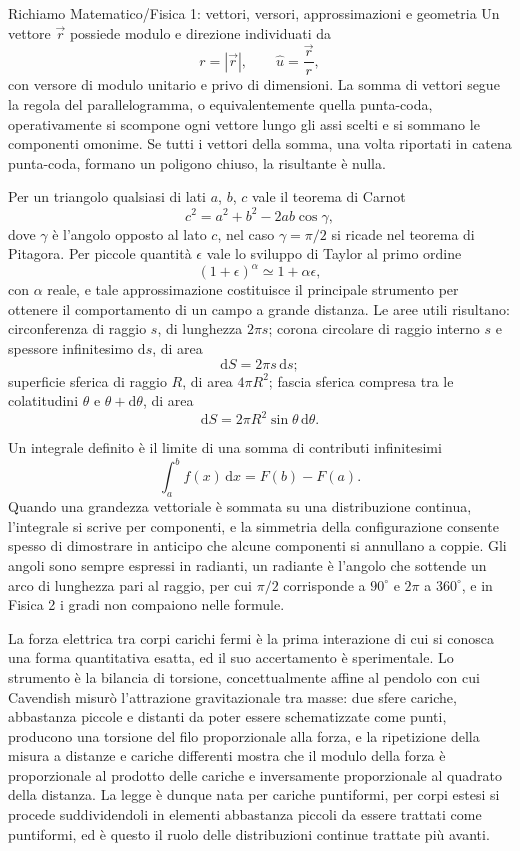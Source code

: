 \documentclass[11pt,a4paper]{article}
\newcommand{\dd}{\mathrm{d}}
\newcommand{\uv}{\hat{u}}
\newcommand{\titoletto}[1]{\par\Needspace{4\baselineskip}\medskip\noindent{\large\scshape #1}\par\nopagebreak\smallskip\noindent}
\begin{document}
\begin{richiamo}{Richiamo Matematico/Fisica 1: vettori, versori, approssimazioni e geometria}
Un vettore $\vec r$ possiede modulo e direzione individuati da
\[
r=|\vec r|, \qquad \uv=\frac{\vec r}{r},
\]
con versore di modulo unitario e privo di dimensioni. La somma di vettori segue la regola del parallelogramma, o equivalentemente quella punta-coda, operativamente si scompone ogni vettore lungo gli assi scelti e si sommano le componenti omonime. Se tutti i vettori della somma, una volta riportati in catena punta-coda, formano un poligono chiuso, la risultante è nulla.

Per un triangolo qualsiasi di lati $a$, $b$, $c$ vale il teorema di Carnot
\[
c^2=a^2+b^2-2ab\cos\gamma,
\]
dove $\gamma$ è l'angolo opposto al lato $c$, nel caso $\gamma=\pi/2$ si ricade nel teorema di Pitagora. Per piccole quantità $\epsilon$ vale lo sviluppo di Taylor al primo ordine
\[
(1+\epsilon)^{\alpha}\simeq 1+\alpha\epsilon,
\]
con $\alpha$ reale, e tale approssimazione costituisce il principale strumento per ottenere il comportamento di un campo a grande distanza. Le aree utili risultano: circonferenza di raggio $s$, di lunghezza $2\pi s$; corona circolare di raggio interno $s$ e spessore infinitesimo $\dd s$, di area
\[
\dd S=2\pi s\,\dd s;
\]
superficie sferica di raggio $R$, di area $4\pi R^2$; fascia sferica compresa tra le colatitudini $\theta$ e $\theta+\dd\theta$, di area
\[
\dd S=2\pi R^2\sin\theta\,\dd\theta.
\]

Un integrale definito è il limite di una somma di contributi infinitesimi
\[
\int_a^b f(x)\,\dd x = F(b)-F(a).
\]
Quando una grandezza vettoriale è sommata su una distribuzione continua, l'integrale si scrive per componenti, e la simmetria della configurazione consente spesso di dimostrare in anticipo che alcune componenti si annullano a coppie. Gli angoli sono sempre espressi in radianti, un radiante è l'angolo che sottende un arco di lunghezza pari al raggio, per cui $\pi/2$ corrisponde a $90^{\circ}$ e $2\pi$ a $360^{\circ}$, e in Fisica 2 i gradi non compaiono nelle formule.
\end{richiamo}

\titoletto{La legge di Coulomb e il suo accertamento sperimentale}
La forza elettrica tra corpi carichi fermi è la prima interazione di cui si conosca una forma quantitativa esatta, ed il suo accertamento è sperimentale. Lo strumento è la bilancia di torsione, concettualmente affine al pendolo con cui Cavendish misurò l'attrazione gravitazionale tra masse: due sfere cariche, abbastanza piccole e distanti da poter essere schematizzate come punti, producono una torsione del filo proporzionale alla forza, e la ripetizione della misura a distanze e cariche differenti mostra che il modulo della forza è proporzionale al prodotto delle cariche e inversamente proporzionale al quadrato della distanza. La legge è dunque nata per cariche puntiformi, per corpi estesi si procede suddividendoli in elementi abbastanza piccoli da essere trattati come puntiformi, ed è questo il ruolo delle distribuzioni continue trattate più avanti.
\end{document}
